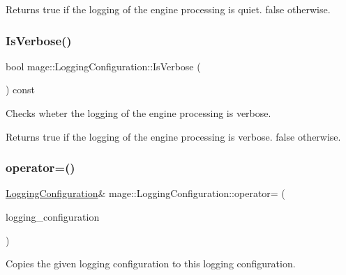 \begin{DoxyReturn}{Returns}
{\ttfamily true} if the logging of the engine processing is quiet. {\ttfamily false} otherwise. 
\end{DoxyReturn}
\hypertarget{structmage_1_1_logging_configuration_a13d91de33f888eee31f4d4e6b1237675}{}\label{structmage_1_1_logging_configuration_a13d91de33f888eee31f4d4e6b1237675} 
\subsubsection{\texorpdfstring{Is\+Verbose()}{IsVerbose()}}
{\footnotesize\ttfamily bool mage\+::\+Logging\+Configuration\+::\+Is\+Verbose (\begin{DoxyParamCaption}{ }\end{DoxyParamCaption}) const}

Checks wheter the logging of the engine processing is verbose.

\begin{DoxyReturn}{Returns}
{\ttfamily true} if the logging of the engine processing is verbose. {\ttfamily false} otherwise. 
\end{DoxyReturn}
\hypertarget{structmage_1_1_logging_configuration_af35d0b0a2f5743944d3d9d66580074db}{}\label{structmage_1_1_logging_configuration_af35d0b0a2f5743944d3d9d66580074db} 
\subsubsection{\texorpdfstring{operator=()}{operator=()}}
{\footnotesize\ttfamily \hyperlink{structmage_1_1_logging_configuration}{Logging\+Configuration}\& mage\+::\+Logging\+Configuration\+::operator= (\begin{DoxyParamCaption}\item[{const \hyperlink{structmage_1_1_logging_configuration}{Logging\+Configuration} \&}]{logging\+\_\+configuration }\end{DoxyParamCaption})\hspace{0.3cm}{\ttfamily [default]}}

Copies the given logging configuration to this logging configuration.


